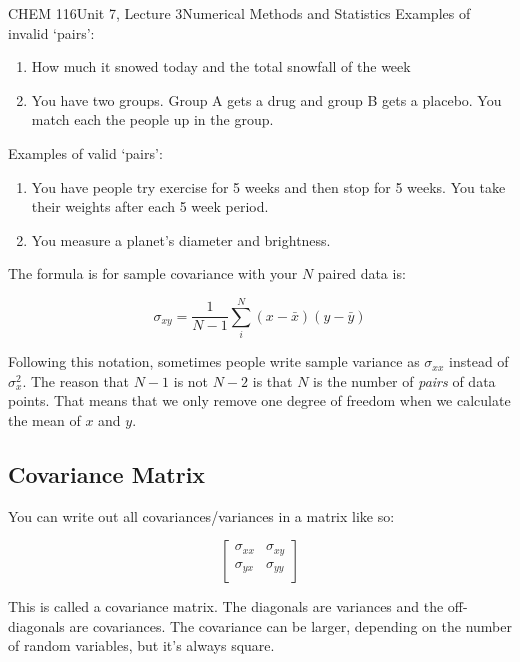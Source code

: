 \documentclass{article}
\begin{document}
\begin{tdoc}{CHEM 116}{Unit 7, Lecture 3}{Numerical Methods and Statistics}
Examples of invalid `pairs':

\begin{enumerate}

\item How much it snowed today and the total snowfall of the week

\item You have two groups. Group A gets a drug and group B gets a
  placebo. You match each the people up in the group.

\end{enumerate}

Examples of valid `pairs':

\begin{enumerate}

  \item You have people try exercise for 5 weeks and then stop for 5
    weeks. You take their weights after each 5 week period.

    \item You measure a planet's diameter and brightness.

\end{enumerate}


The formula is for sample covariance with your $N$ paired data is:

\begin{equation}
  \sigma_{xy}= \frac{1}{N - 1} \sum_i^N (x - \bar{x})(y - \bar{y})
\end{equation}

Following this notation, sometimes people write sample variance as
$\sigma_{xx}$ instead of $\sigma_x^2$. The reason that $N - 1$ is not
$N - 2$ is that $N$ is the number of {\it pairs} of data points. That
means that we only remove one degree of freedom when we calculate the
mean of $x$ and $y$.

\subsection{Covariance Matrix}

You can write out all covariances/variances in a matrix like so:

\[
\left[\begin{array}{lr}
\sigma_{xx} & \sigma_{xy}\\
\sigma_{yx} & \sigma_{yy}\\
  \end{array}\right]
\]

This is called a covariance matrix. The diagonals are variances and
the off-diagonals are covariances. The covariance can be larger,
depending on the number of random variables, but it's always square.



\end{tdoc}
\end{document}

